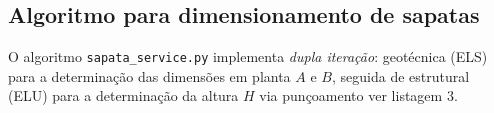 \newpage
\subsection{Algoritmo para dimensionamento de sapatas}


O algoritmo \texttt{sapata\_service.py} implementa \emph{dupla iteração}: geotécnica (ELS) para a determinação das dimensões em planta $A$ e $B$, seguida de estrutural (ELU) para a determinação da altura $H$ via punçoamento ver listagem 3. 

